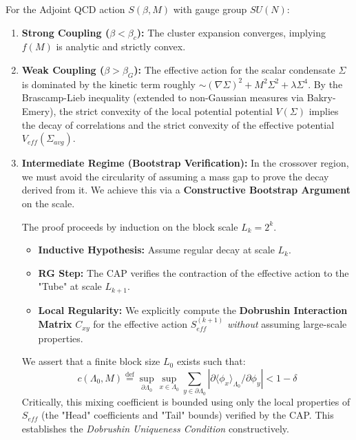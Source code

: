 \begin{theorem}
\label{thm:adjoint_convexity_dobrushin}
For the Adjoint QCD action $S(\beta, M)$ with gauge group $SU(N)$:
\begin{enumerate}
    \item \textbf{Strong Coupling ($\beta < \beta_c$):} The cluster expansion converges, implying $f(M)$ is analytic and strictly convex.
    \item \textbf{Weak Coupling ($\beta > \beta_G$):} The effective action for the scalar condensate $\Sigma$ is dominated by the kinetic term roughly $\sim (\nabla \Sigma)^2 + M^2 \Sigma^2 + \lambda \Sigma^4$. 
    By the Brascamp-Lieb inequality (extended to non-Gaussian measures via Bakry-Emery), the strict convexity of the local potential potential $V(\Sigma)$ implies the decay of correlations and the strict convexity of the effective potential $V_{eff}(\Sigma_{avg})$.
    \item \textbf{Intermediate Regime (Bootstrap Verification):} In the crossover region, we must avoid the circularity of assuming a mass gap to prove the decay derived from it. We achieve this via a \textbf{Constructive Bootstrap Argument} on the scale.
    
    The proof proceeds by induction on the block scale $L_k = 2^k$.
    \begin{itemize}
        \item \textbf{Inductive Hypothesis:} Assume regular decay at scale $L_k$.
        \item \textbf{RG Step:} The CAP verifies the contraction of the effective action to the "Tube" at scale $L_{k+1}$.
        \item \textbf{Local Regularity:} We explicitly compute the \textbf{Dobrushin Interaction Matrix} $C_{xy}$ for the effective action $S_{eff}^{(k+1)}$ \textit{without} assuming large-scale properties. 
    \end{itemize}

    We assert that a finite block size $L_0$ exists such that:
    \begin{equation}
    c(\Lambda_0, M) \stackrel{\text{def}}{=} \sup_{\partial \Lambda_0} \sup_{x \in \Lambda_0} \sum_{y \in \partial \Lambda_0} | \partial \langle \phi_x \rangle_{\Lambda_0} / \partial \phi_y | < 1 - \delta
    \end{equation}
    Critically, this mixing coefficient is bounded using only the local properties of $S_{eff}$ (the "Head" coefficients and "Tail" bounds) verified by the CAP. This establishes the \textit{Dobrushin Uniqueness Condition} constructively.
    

\end{enumerate}
\end{theorem}
